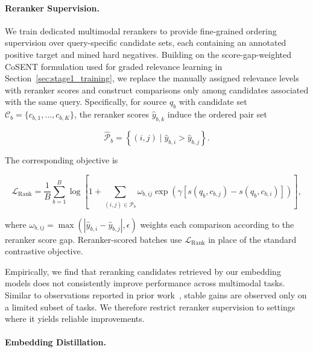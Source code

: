 \documentclass[]{wechat}
\begin{document}
\paragraph{Reranker Supervision.}

We train dedicated multimodal rerankers to provide fine-grained ordering supervision over query-specific candidate sets, each containing an annotated positive target and mined hard negatives. Building on the score-gap-weighted CoSENT formulation used for graded relevance learning in Section~\ref{sec:stage1_training}, we replace the manually assigned relevance levels with reranker scores and construct comparisons only among candidates associated with the same query. Specifically, for source $q_b$ with candidate set $\mathcal{C}_b=\{c_{b,1},\ldots,c_{b,K}\}$, the reranker scores $\hat{y}_{b,k}$ induce the ordered pair set

\begin{equation}
    \widehat{\mathcal{P}}_b
    =
    \left\{
        (i,j)
        \mid
        \hat{y}_{b,i}>\hat{y}_{b,j}
    \right\}.
    \label{eq:reranker_ordering}
\end{equation}

The corresponding objective is

\begin{equation}
    \mathcal{L}_{\mathrm{Rank}}
    =
    \frac{1}{B}
    \sum_{b=1}^{B}
    \log
    \left[
        1+
        \sum_{(i,j)\in\widehat{\mathcal{P}}_b}
        \omega_{b,ij}
        \exp
        \left(
            \gamma
            \left[
                s(q_b,c_{b,j})
                -
                s(q_b,c_{b,i})
            \right]
        \right)
    \right],
    \label{eq:reranker_ranking_loss}
\end{equation}

where
$\omega_{b,ij}=\max\!\left(\left|\hat{y}_{b,i}-\hat{y}_{b,j}\right|,\epsilon\right)$
weights each comparison according to the reranker score gap. Reranker-scored batches use $\mathcal{L}_{\mathrm{Rank}}$ in place of the standard contrastive objective.

Empirically, we find that reranking candidates retrieved by our embedding models does not consistently improve performance across multimodal tasks. Similar to observations reported in prior work~\citep{qwen3vl-emb}, stable gains are observed only on a limited subset of tasks. We therefore restrict reranker supervision to settings where it yields reliable improvements.


\paragraph{Embedding Distillation.}
\end{document}
